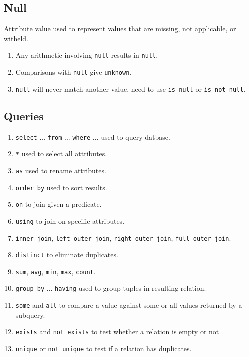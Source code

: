\documentclass[twocolumn,english]{article}
\begin{document}
\subsection{Null}

Attribute value used to represent values that are missing, not applicable,
or witheld. 
\begin{enumerate}
\item Any arithmetic involving \texttt{null} results in \texttt{null}.
\item Comparisons with \texttt{null} give \texttt{unknown}.
\item \texttt{null} will never match another value, need to use \texttt{is
null} or \texttt{is not null}.
\end{enumerate}

\subsection{Queries}
\begin{enumerate}
\item \texttt{select} ... \texttt{from} ... \texttt{where} ... used to query
datbase.
\item \texttt{{*}} used to select all attributes.
\item \texttt{as} used to rename attributes.
\item \texttt{order by} used to sort results.
\item \texttt{on} to join given a predicate.
\item \texttt{using} to join on specific attributes.
\item \texttt{inner join}, \texttt{left outer join}, \texttt{right outer
join}, \texttt{full outer join}.
\item \texttt{distinct} to eliminate duplicates.
\item \texttt{sum}, \texttt{avg}, \texttt{min}, \texttt{max}, \texttt{count}.
\item \texttt{group by} ... \texttt{having} used to group tuples in resulting
relation.
\item \texttt{some} and \texttt{all} to compare a value against some or
all values returned by a subquery.
\item \texttt{exists} and \texttt{not exists} to test whether a relation
is empty or not
\item \texttt{unique} or \texttt{not unique} to test if a relation has duplicates.\end{enumerate}
\end{document}
